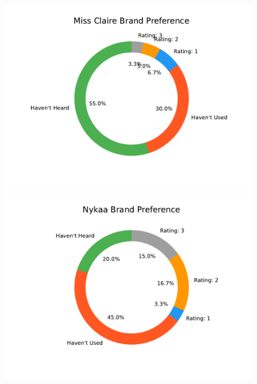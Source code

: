 \documentclass{article}
\begin{document}
\begin{figure}[htbp]
    \centering
    \includegraphics[scale=0.6]{../images/survey-graphs/Miss Claire-brand-preference.pdf}
    \includegraphics[scale=0.6]{../images/survey-graphs/Nykaa-brand-preference.pdf}
\end{figure}
\end{document}
